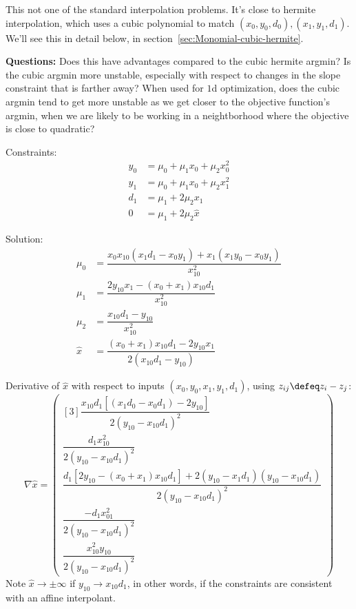 This not one of the standard interpolation problems.
It's close to hermite interpolation,
which uses a cubic polynomial to match
$(x_0,y_0,d_0),(x_1,y_1,d_1)$.
We'll see this in detail below,
in section~\ref{sec:Monomial-cubic-hermite}.

\textbf{Questions:}
Does this have advantages compared to the cubic hermite argmin?
Is the cubic argmin more
unstable, especially with respect to changes in the
slope constraint that is farther away?
When used for $1$d optimization,
does the cubic argmin tend to get more unstable as we get closer
to the objective function's argmin, 
when we are likely to be working in a neightborhood where
the objective is close to quadratic?

\newpage 

Constraints:
\begin{align}
y_0 & = \mu_0+\mu_1 x_0+\mu_2 x_0^{2}  
\\
y_1 & = \mu_0+\mu_1 x_0+\mu_2 x_1^{2}  
\nonumber
\\
d_1 & = \mu_1 + 2 \mu_2 x_1  
\nonumber
\\
0 & = \mu_1 + 2 \mu_2 \hat{x}  
\nonumber
\end{align}

Solution:
\begin{align}
\mu_0 & =
\dfrac{
x_0 x_{10} \left( x_1 d_1 - x_0 y_1 \right) 
+ x_1 \left( x_1 y_0 - x_0 y_1 \right)
}{x_{10}^{2}}
\\
\mu_1 & =
\dfrac{2 y_{10} x_1 - \left(x_0+x_1\right) x_{10} d_1}{x_{10}^{2}}
\nonumber
\\
\mu_2 & = \dfrac{x_{10} d_1 - y_{10}}{x_{10}^{2}}
\nonumber 
\\
\hat{x} & =
\dfrac{
\left(x_0+x_1\right) x_{10} d_1 - 2 y_{10} x_1
}{2 \left( x_{10} d_1 - y_{10} \right)}
\nonumber 
\end{align}

\newpage

Derivative of $\hat{x}$ with respect to inputs
$(x_0,y_0,x_1,y_1,d_1)$,
using $z_{ij} \defeq z_i - z_j$:
\begin{equation}
\nabla \hat{x} =
\begin{pmatrix}[3]
\dfrac{
x_{10} d_1 \left[ \left(x_1 d_0 - x_0 d_1 \right) -2 y_{10}\right]
}{
2 \left(y_{10} - x_{10} d_1\right)^{2}
}
\\
\dfrac{
d_1 x_{10}^{2}
}{
2 \left(y_{10} - x_{10} d_1\right)^{2}
} 
\\
\dfrac{
d_1 \left[ 2 y_{10} - \left( x_0 + x_1 \right) x_{10} d_1 \right]
+
2 
\left(y_{10} - x_1 d_1 \right) \left( y_{10} - x_{10} d_1 \right)
}{
2 \left(y_{10} - x_{10} d_1\right)^{2}
}
\\
\dfrac{
-d_1 x_{01}^{2}
}{
2 \left(y_{10} - x_{10} d_1\right)^{2}
}
\\ 
\dfrac{x_{10}^{2} y_{10}}{
2 \left(y_{10} - x_{10} d_1\right)^{2}
}
\end{pmatrix}
\end{equation}
Note $\hat{x} \to \pm \infty$ if $y_{10} \to x_{10} d_1$,
in other words, if the constraints are consistent with an
affine interpolant.

